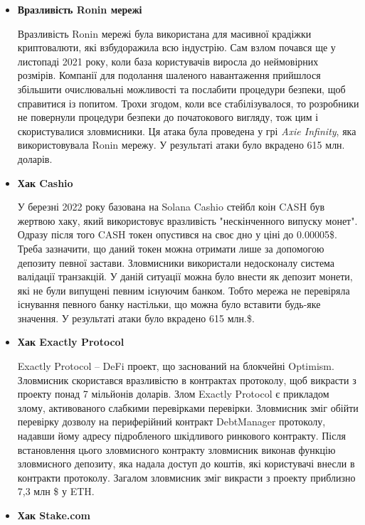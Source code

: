 \begin{itemize}

    \item \textbf{Вразливість Ronin мережі}

        Вразливість Ronin мережі була використана для масивної крадіжки криптовалюти, які взбудоражила всю індустрію. Сам взлом почався ще у листопаді 2021 року, коли база користувачів виросла до неймовірних розмірів. Компанії для подолання шаленого навантаження прийшлося збільшити очислювальні можливості та послабити процедури безпеки, щоб справитися із попитом. Трохи згодом, коли все стабілізувалося, то розробники не повернули процедури безпеки до початокового вигляду, тож цим і скористувалися зловмисники. Ця атака була проведена у грі \textit{Axie Infinity}, яка використовувала Ronin мережу. У результаті атаки було вкрадено 615 млн. доларів. 
    
    \item \textbf{Хак Cashio}
    
        У березні 2022 року базована на Solana Cashio стейбл коін CASH був жертвою хаку, який використовує вразливість "нескінченного випуску монет". Одразу після того CASH токен опустився на своє дно у ціні до 0.00005\$. Треба зазначити, що даний токен можна отримати лише за допомогою депозиту певної застави. Зловмисники використали недосконалу система валідації транзакцій. У даній ситуації можна було внести як депозит монети, які не були випущені певним існуючим банком. Тобто мережа не перевіряла існування певного банку настільки, що можна було вставити будь-яке значення. У результаті атаки було вкрадено 615 млн.\$.
    
    \item \textbf{Хак Exactly Protocol}
    
        Exactly Protocol -- DeFi проект, що заснований на блокчейні Optimism. Зловмисник скористався вразливістю в контрактах протоколу, щоб викрасти з проекту понад 7 мільйонів доларів. Злом Exactly Protocol є прикладом злому, активованого слабкими перевірками перевірки. Зловмисник зміг обійти перевірку дозволу на периферійний контракт DebtManager протоколу, надавши йому адресу підробленого шкідливого ринкового контракту. Після встановлення цього зловмисного контракту зловмисник виконав функцію зловмисного депозиту, яка надала доступ до коштів, які користувачі внесли в контракти протоколу. Загалом зловмисник зміг викрасти з проекту приблизно 7,3 млн \$ у ETH.
        
    \item \textbf{Хак Stake.com}


\end{itemize}
